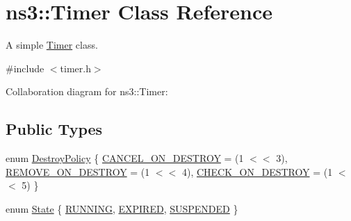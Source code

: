 \hypertarget{classns3_1_1Timer}{}\section{ns3\+:\+:Timer Class Reference}
\label{classns3_1_1Timer}


A simple \hyperlink{classns3_1_1Timer}{Timer} class.  




{\ttfamily \#include $<$timer.\+h$>$}



Collaboration diagram for ns3\+:\+:Timer\+:
\subsection*{Public Types}
\begin{DoxyCompactItemize}
\item 
enum \hyperlink{classns3_1_1Timer_a816309b83cd2a35bea47d9bbc6bbf721}{Destroy\+Policy} \{ \hyperlink{classns3_1_1Timer_a816309b83cd2a35bea47d9bbc6bbf721a07a9dd5063b32fb6cf1f813c6ee7e28e}{C\+A\+N\+C\+E\+L\+\_\+\+O\+N\+\_\+\+D\+E\+S\+T\+R\+OY} = (1 $<$$<$ 3), 
\hyperlink{classns3_1_1Timer_a816309b83cd2a35bea47d9bbc6bbf721a2e7169520dfa83c15219cb701832ad43}{R\+E\+M\+O\+V\+E\+\_\+\+O\+N\+\_\+\+D\+E\+S\+T\+R\+OY} = (1 $<$$<$ 4), 
\hyperlink{classns3_1_1Timer_a816309b83cd2a35bea47d9bbc6bbf721a14b70e990e7118eab850607d3d1640dc}{C\+H\+E\+C\+K\+\_\+\+O\+N\+\_\+\+D\+E\+S\+T\+R\+OY} = (1 $<$$<$ 5)
 \}
\item 
enum \hyperlink{classns3_1_1Timer_aa83d09264a6bcc19bfc7831ef315ddf6}{State} \{ \hyperlink{classns3_1_1Timer_aa83d09264a6bcc19bfc7831ef315ddf6a0e0ab91e643e24496879d5a32d09abe0}{R\+U\+N\+N\+I\+NG}, 
\hyperlink{classns3_1_1Timer_aa83d09264a6bcc19bfc7831ef315ddf6a3efb9c318ef18d499f95728c2ff6fc95}{E\+X\+P\+I\+R\+ED}, 
\hyperlink{classns3_1_1Timer_aa83d09264a6bcc19bfc7831ef315ddf6a768cdca14833a571ff09ef2f2f744d11}{S\+U\+S\+P\+E\+N\+D\+ED}
 \}
\end{DoxyCompactItemize}
